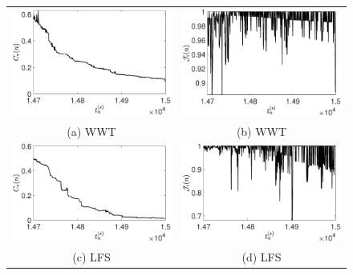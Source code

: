 \documentclass[aps,prl,preprint,groupedaddress]{revtex4-1}
\begin{document}
\begin{figure}[!ht]
\centering
\begin{tabular}{cc}
\includegraphics[width=.525\textwidth]{cratio_wwt_K_256_Lx_128_tf_1pt5e4} &\hspace{-25pt} \includegraphics[width=.525\textwidth]{oratio_wwt_K_256_Lx_128_tf_1pt5e4}\\
(a) WWT & (b) WWT\\
\includegraphics[width=.525\textwidth]{cratio_lfforce_K_256_Lx_128_tf_1pt5e4} &\hspace{-25pt} \includegraphics[width=.525\textwidth]{oratio_lfforce_K_256_Lx_128_tf_1pt5e4}\\
(c) LFS & (d) LFS\\

\end{tabular}
\end{figure}
\end{document}
